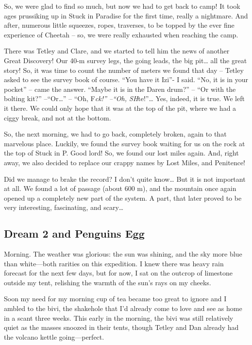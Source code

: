 So, we were glad to find so much, but now we had to get back to camp! It
took ages prussiking up in Stuck in Paradise for the first time, really
a nightmare. And after, numerous little squeezes, ropes, traverses, to
be topped by the ever fine experience of Cheetah -- so, we were really
exhausted when reaching the camp.

There was Tetley and Clare, and we started to tell him the news of
another Great Discovery! Our 40-m survey legs, the going leads, the big
pit\ldots{} all the great story! So, it was time to count the number of
meters we found that day -- Tetley asked to see the survey book of
course. ``You have it Izi''- I said. ``No, it is in your pocket'' --
came the answer. ``Maybe it is in the Daren drum?'' -- ``Or with the
bolting kit?'' --``Or\ldots{}'' -- ``Oh, F\emph{ck!'' --``Oh,
SH}te!''\ldots{} Yes, indeed, it is true. We left it there. We could
only hope that it was at the top of the pit, where we had a ciggy break,
and not at the bottom.

So, the next morning, we had to go back, completely broken, again to
that marvelous place. Luckily, we found the survey book waiting for us
on the rock at the top of Stuck in P. Good lord! So, we found our lost
miles again. And, right away, we also decided to replace our crappy
names by Lost Miles, and Penitence!

Did we manage to brake the record? I don't quite know\ldots{} But it is
not important at all. We found a lot of passage (about 600 m), and the
mountain once again opened up a completely new part of the system. A
part, that later proved to be very interesting, fascinating, and
scary\ldots{}


\hypertarget{dream-2-and-penguins-egg}{%
\subsection{Dream 2 and Penguins Egg}\label{dream-2-and-penguins-egg}}

Morning. The weather was glorious: the sun was shining, and the sky more
blue than white---both rarities on this expedition. I knew there was
heavy rain forecast for the next few days, but for now, I sat on the
outcrop of limestone outside my tent, relishing the warmth of the sun's
rays on my cheeks.

Soon my need for my morning cup of tea became too great to ignore and I
ambled to the bivi, the shakehole that I'd already come to love and see
as home in a scant three weeks. This early in the morning, the bivi was
still relatively quiet as the masses snoozed in their tents, though
Tetley and Dan already had the volcano kettle going---perfect.

